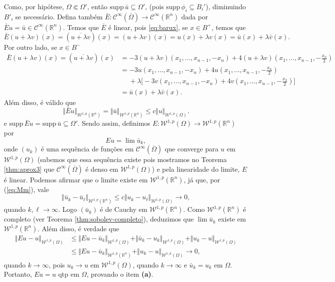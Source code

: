 \documentclass[a4paper, 11pt]{book}
\theoremstyle{definition}
\newcommand{\bR}{\mathbb{R}}
\newcommand{\cC}{\mathcal{C}}
\newcommand{\cW}{\mathcal{W}}
\newcommand{\supp}{\mathrm{supp}\,}
\begin{document}
\begin{prf}
    Como, por hipótese, $\Omega \Subset \Omega'$, então $\supp \bar u \subseteq \Omega'$, (pois $\supp \phi_i \subseteq B_i'$), diminuindo $B'_i$ se necessário.
    Defina também $\bar E: \cC^\infty(\overline\Omega) \to \cC^\infty(\bR^n)$ dada por $\bar E u = \bar u \in \cC^{\infty}(\bR^n)$.
    Temos que $\bar E$ é linear, pois \ref{eq:barux}, se $x \in B^+$, temos que
    \[
        \bar E(u + \lambda v)(x) = (\overline{u + \lambda v})(x) = (u + \lambda v)(x) = u(x) + \lambda v(x) = \bar u(x) + \lambda \bar v(x).
    \]
    Por outro lado, se $x \in B^-$
    \[
        \begin{aligned}
            \bar E(u + \lambda v)(x) = (\overline{u + \lambda v})(x) &= -3(u + \lambda v)(x_1,\dots,x_{n-1},-x_n) + 4(u + \lambda v)(x_1,\dots,x_{n-1},-\frac{x_n}{2})\\
            &= -3 u(x_1,\dots,x_{n-1},-x_n) + 4 u(x_1,\dots,x_{n-1},-\frac{x_n}{2})\\ &\quad\;+ \lambda\big[-\!3 v(x_1,\dots,x_{n-1},-x_n) + 4v(x_1,\dots,x_{n-1},-\frac{x_2}{2}) \big]\\[5pt]
            &= \bar u(x) + \lambda \bar v(x).
        \end{aligned}
    \]
    Além disso, é válido que
    \[
        \Vert \bar E u \Vert_{\cW^{1,p}(\bR^n)} = \Vert \bar u \Vert_{\cW^{1,p}(\bR^n)} \leqslant c \Vert u \Vert_{\cW^{1,p}(\Omega)}.
    \]
    e $\supp \bar E u  = \supp \bar u \subseteq \Omega'.$
    Sendo assim, definimos $E : \cW^{1,p}(\Omega) \to \cW^{1,p}(\bR^n)$ por
    \[
        Eu = \lim \bar u_k,
    \]
    onde $(u_k)$ é uma sequência de funções em $\cC^\infty(\overline\Omega)$ que converge para $u$ em $\cW^{1,p}(\Omega)$ (sabemos que essa sequência existe pois mostramos no Teorema \ref{thm:aprox3} que $\cC^\infty(\overline\Omega)$ é denso em $\cW^{1,p}(\Omega)$) e pela linearidade do limite, $E$ é linear.
    Podemos afirmar que o limite existe em $\cW^{1,p}(\bR^n)$, já que, por (\ref{eq:Mm}), vale
    \[
        \Vert \bar u_k - \bar u_\ell \Vert_{\cW^{1,p}(\bR^n)} \leqslant c \Vert u_k - u_\ell \Vert_{\cW^{1,p}(\Omega)} \to 0,
    \]
    quando $k,\ell \to \infty$.
    Logo $(\bar u_k)$ é de Cauchy em $\cW^{1,p}(\bR^n)$.
    Como $\cW^{1,p}(\bR^n)$ é completo (ver Teorema \ref{thm:sobolev-completo}), deduzimos que $\lim \bar u_k$ existe em $\cW^{1,p}(\bR^n)$.
    Além disso, é verdade que
    \[
        \begin{aligned}
            \Vert Eu - u \Vert_{\cW^{1,p}(\Omega)} &\leqslant \Vert Eu - \bar u_k \Vert_{\cW^{1,p}(\Omega)} + \Vert \bar u_k - u_k \Vert_{\cW^{1,p}(\Omega)} + \Vert u_k - u\Vert_{\cW^{1,p}(\Omega)}\\
            &\leqslant \Vert Eu - \bar u_k \Vert_{\cW^{1,p}(\bR^n)} + \Vert u_k - u \Vert_{\cW^{1,p}(\Omega)} \to 0,
        \end{aligned}
    \]
    quando $k \to \infty$,
    pois $u_k \to u$ em $\cW^{1,p}(\Omega)$, quando $k \to \infty$ e $\bar u_k = u_k$ em $\Omega$.
    Portanto, $Eu = u$ qtp em $\Omega$, provando o item \textbf{(a)}.


\end{prf}
\end{document}
